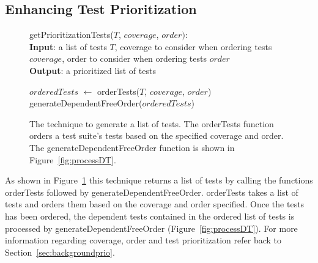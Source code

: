 \subsection{Enhancing Test Prioritization}
\label{sec:enhanceprio}
\begin{figure}[t]
	getPrioritizationTests($\mathit{T}$, $\mathit{coverage}$, $\mathit{order}):$\\
	\textbf{Input}: a list of tests $\mathit{T}$, coverage to consider when ordering
	tests $\mathit{coverage}$, order to consider when ordering tests $\mathit{order}$\\
	\textbf{Output}: a prioritized list of tests\\
	 \begin{algorithmic}[1]
	 	\vspace{-5mm}
		\STATE $\mathit{orderedTests}$ $\leftarrow$ orderTests($\mathit{T}$,
		$\mathit{coverage}$, $\mathit{order}$)
		\RETURN generateDependentFreeOrder($\mathit{orderedTests}$)
	\end{algorithmic}
	\vspace{-3mm}
	\caption {
		The technique to generate a list of tests. The orderTests function orders
		a test suite's tests based on the specified coverage and order. The
		generateDependentFreeOrder function is shown in Figure~\ref{fig:processDT}.
	}
	\label{fig:prioritization}
\end{figure}
As shown in Figure~\ref{fig:prioritization} this technique returns a
list of tests by calling the functions orderTests followed by
generateDependentFreeOrder. orderTests takes a list of tests and orders them based on
the coverage and order specified. Once the tests has been
ordered, the dependent tests contained in the ordered list of tests is processed by
generateDependentFreeOrder (Figure~\ref{fig:processDT}). For more information
regarding coverage, order and test prioritization refer back to
Section~\ref{sec:backgroundprio}.

